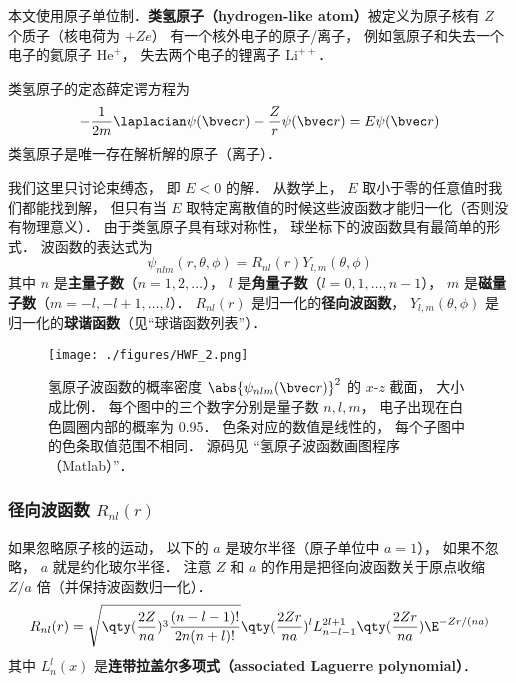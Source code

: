 

本文使用原子单位制．\textbf{类氢原子（hydrogen-like atom）}被定义为原子核有 $Z$ 个质子（核电荷为 $+Ze$） 有一个核外电子的原子/离子， 例如氢原子和失去一个电子的氦原子 $\mathrm{He}^+$， 失去两个电子的锂离子 $\mathrm{Li}^{++}$． %

类氢原子的定态薛定谔方程为
\begin{equation}\label{HWF_eq1}
-\frac{1}{2m} \laplacian \psi(\bvec r) - \frac{Z}{r} \psi(\bvec r) = E \psi(\bvec r)
\end{equation}
类氢原子是唯一存在解析解的原子（离子）．

我们这里只讨论束缚态， 即 $E < 0$ 的解．  从数学上， $E$ 取小于零的任意值时我们都能找到解， 但只有当 $E$ 取特定离散值的时候这些波函数才能归一化（否则没有物理意义）． 由于类氢原子具有球对称性， 球坐标下的波函数具有最简单的形式． 波函数的表达式为
\begin{equation}\label{HWF_eq3}
\psi_{nlm} (r,\theta ,\phi) = R_{nl}(r) Y_{l,m}(\theta, \phi)
\end{equation}
其中 $n$ 是\textbf{主量子数}（$n = 1, 2, \dots$）， $l$ 是\textbf{角量子数}（$l = 0, 1, \dots, n - 1$）， $m$ 是\textbf{磁量子数}（$m = -l, -l+1, \dots, l$）． $R_{nl}(r)$ 是归一化的\textbf{径向波函数}， $Y_{l,m}(\theta, \phi)$ 是归一化的\textbf{球谐函数}（见“球谐函数列表”）．

\begin{figure}[ht]
\centering
\texttt{[image: ./figures/HWF\_2.png]}
\caption{氢原子波函数的概率密度 $\abs{\psi_{nlm}(\bvec r)}^2$ 的 $x$-$z$ 截面， 大小成比例． 每个图中的三个数字分别是量子数 $n, l, m$， 电子出现在白色圆圈内部的概率为 0.95． 色条对应的数值是线性的， 每个子图中的色条取值范围不相同． 源码见 “氢原子波函数画图程序（Matlab）”．} \label{HWF_fig2}
\end{figure}

\subsubsection{径向波函数 $R_{nl}(r)$}

如果忽略原子核的运动， 以下的 $a$ 是玻尔半径（原子单位中 $a=1$）， 如果不忽略， $a$ 就是约化玻尔半径．%
注意 $Z$ 和 $a$ 的作用是把径向波函数关于原点收缩 $Z/a$ 倍（并保持波函数归一化）．
\begin{equation}\label{HWF_eq2}
R_{nl}(r) = \sqrt{\qty(\frac{2 Z}{na})^3 \frac{(n - l - 1)!}{2n (n + l)!}} \qty(\frac{2Zr}{na})^l  L_{n-l-1}^{2l+1}\qty(\frac{2Zr}{na}) \E^{-Zr/(na)}
\end{equation}
其中 $L_n^l(x)$ 是\textbf{连带拉盖尔多项式（associated Laguerre polynomial）}． %


